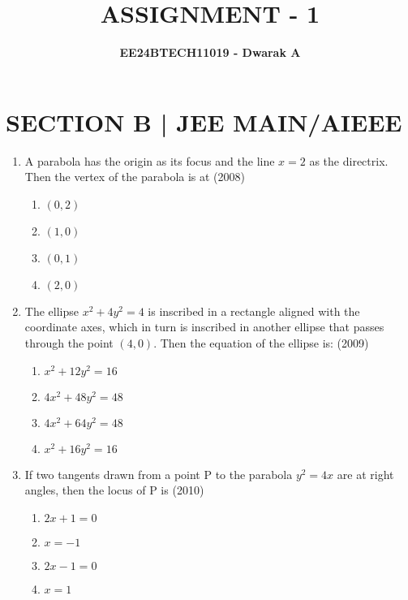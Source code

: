 \documentclass[journal,12pt,twocolumn]{IEEEtran}
\theoremstyle{remark}
\begin{document}

\vspace{3cm}

\title{\textbf{ASSIGNMENT - 1}}
\author{\textbf{EE24BTECH11019 - Dwarak A}}
\maketitle
\newpage
\bigskip

\renewcommand{\thefigure}{\theenumi}
\renewcommand{\thetable}{\theenumi}

\section*{\textbf{SECTION B | JEE MAIN/AIEEE}}
\bigskip

\begin{enumerate}[label=\arabic*.]
    \item A parabola has the origin as its focus and the line $x=2$ as the directrix. Then the vertex of the parabola is at
    \hfill(2008)

    \begin{enumerate}[label=(\alph*)]
    \item$(0,2)$
    \item$(1,0)$
    \item$(0,1)$
    \item$(2,0)$ \\
    \end{enumerate}
    
    \item The ellipse $x^2+4y^2=4$ is inscribed in a rectangle aligned with the coordinate axes, which in turn is inscribed in another ellipse that passes through the point $(4,0)$. Then the equation of the ellipse is:
    \hfill(2009)

    \begin{enumerate}[label=(\alph*)]
    \item$x^2+12y^2=16$
    \item$4x^2+48y^2=48$
    \item$4x^2+64y^2=48$
    \item$x^2+16y^2=16$ \\
    \end{enumerate}

    \item If two tangents drawn from a point P to the parabola $y^2=4x$ are at right angles, then the locus of P is
    \hfill(2010)
    
    \begin{enumerate}[label=(\alph*)]
    \item$2x+1=0$
    \item$x=-1$
    \item$2x-1=0$
    \item$x=1$ \\
    \end{enumerate}


\end{enumerate}
\end{document}
